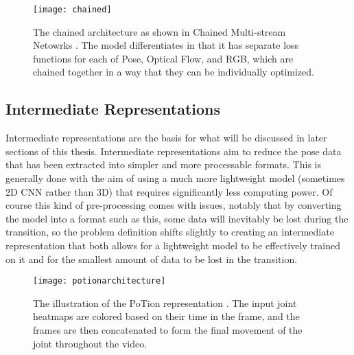 \begin{figure}[h]
	\texttt{[image: chained]}
	\centering
	\caption{The chained architecture as shown in Chained Multi-stream Netowrks \cite{Chained}. The model differentiates in that it has separate loss functions for each of Pose, Optical Flow, and RGB, which are chained together in a way that they can be individually optimized.}
	\label{fig:chained}
\end{figure}

\subsection{Intermediate Representations}
\label{sec:intermediate}

Intermediate representations are the basis for what will be discussed in later sections of this thesis. Intermediate representations aim to reduce the pose data that has been extracted into simpler and more processable formats. This is generally done with the aim of using a much more lightweight model (sometimes 2D CNN rather than 3D) that requires significantly less computing power. Of course this kind of pre-processing comes with issues, notably that by converting the model into a format such as this, some data will inevitably be lost during the transition, so the problem definition shifts slightly to creating an intermediate representation that both allows for a lightweight model to be effectively trained on it and for the smallest amount of data to be lost in the transition.

\begin{figure}[h]
	\texttt{[image: potionarchitecture]}
	\centering
	\caption{The illustration of the PoTion representation \cite{potion}. The input joint heatmaps are colored based on their time in the frame, and the frames are then concatenated to form the final movement of the joint throughout the video.}
	\label{fig:potion-architecture}
\end{figure}

